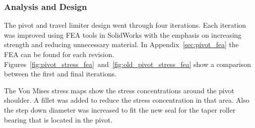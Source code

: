 \subsubsection{Analysis and Design}
The pivot and travel limiter design went through four iterations. Each iteration was improved using FEA tools in SolidWorks with the emphasis on increasing strength and reducing unnecessary material. In Appendix~\ref{sec:pivot_fea} the FEA can be found for each revision. Figures~\ref{fig:pivot_stress_fea}~and~\ref{fig:old_pivot_stress_fea} show a comparison between the first and final iterations.

The Von Mises stress maps show the stress concentrations around the pivot shoulder. A fillet was added to reduce the stress concentration in that area. Also the step down diameter was increased to fit the new seal for the taper roller bearing that is located in the pivot.


